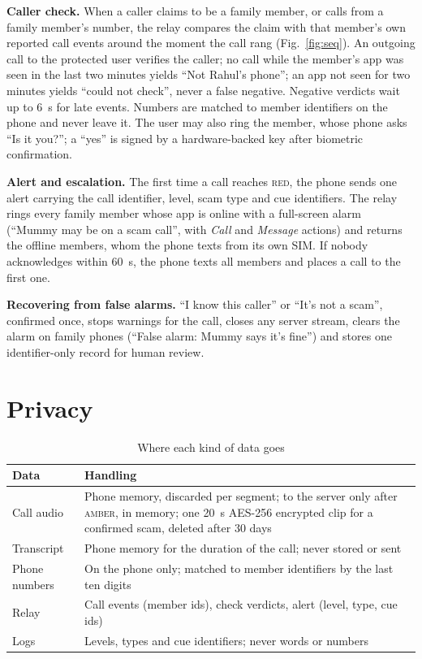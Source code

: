 \documentclass[conference,a4paper]{IEEEtran}
\newcommand{\amber}{\textsc{amber}}
\newcommand{\red}{\textsc{red}}
\begin{document}
\textbf{Caller check.} When a caller claims to be a family member, or calls from a family member's number, the relay
compares the claim with that member's own reported call events around the moment the call rang
(Fig.~\ref{fig:seq}). An outgoing call to the protected user verifies the caller; no call while the member's app was
seen in the last two minutes yields ``Not Rahul's phone''; an app not seen for two minutes yields ``could not
check'', never a false negative. Negative verdicts wait up to 6~s for late events. Numbers are matched to member
identifiers on the phone and never leave it. The user may also ring the member, whose phone asks ``Is it you?''; a
``yes'' is signed by a hardware-backed key after biometric confirmation.

\textbf{Alert and escalation.} The first time a call reaches \red{}, the phone sends one alert carrying the call
identifier, level, scam type and cue identifiers. The relay rings every family member whose app is online with a
full-screen alarm (``Mummy may be on a scam call'', with \emph{Call} and \emph{Message} actions) and returns the
offline members, whom the phone texts from its own SIM. If nobody acknowledges within 60~s, the phone texts all
members and places a call to the first one.

\textbf{Recovering from false alarms.} ``I know this caller'' or ``It's not a scam'', confirmed once, stops warnings
for the call, closes any server stream, clears the alarm on family phones (``False alarm: Mummy says it's fine'')
and stores one identifier-only record for human review.

\section{Privacy}
\label{sec:privacy}

\begin{table}[t]
\centering
\caption{Where each kind of data goes}
\label{tab:privacy}
\small
\begin{tabular}{@{}p{}p{}@{}}
\toprule
Data & Handling \\
\midrule
Call audio & Phone memory, discarded per segment; to the server only after \amber{}, in memory; one 20~s AES-256 encrypted clip for a confirmed scam, deleted after 30 days \\
Transcript & Phone memory for the duration of the call; never stored or sent \\
Phone numbers & On the phone only; matched to member identifiers by the last ten digits \\
Relay & Call events (member ids), check verdicts, alert (level, type, cue ids) \\
Logs & Levels, types and cue identifiers; never words or numbers \\
\bottomrule
\end{tabular}
\end{table}
\end{document}
